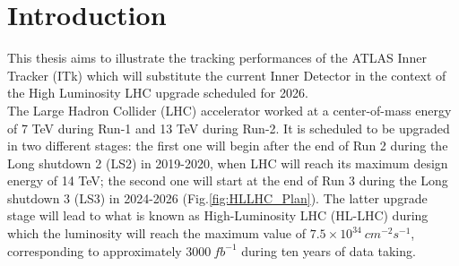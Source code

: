 \documentclass[a4paper,twoside,12pt]{article}
\begin{document}


\maketitle


\tableofcontents
\newpage

\newpage

\section*{Introduction} \label{sec:introduction}
This thesis aims to illustrate the tracking performances of the ATLAS Inner Tracker (ITk) which will substitute the current Inner Detector in the context
of the High Luminosity LHC upgrade scheduled for 2026. \\

The Large Hadron Collider (LHC) accelerator worked at a center-of-mass energy of 7 TeV during Run-1 and 13 TeV during Run-2. It is scheduled to be upgraded in two different stages: the first one will begin after the end of Run 2 during the Long shutdown 2 (LS2) in 2019-2020, when LHC will reach its maximum design energy of 14 TeV; the second one will start at the end of Run 3 during the Long shutdown 3 (LS3) in 2024-2026 (Fig.\ref{fig:HLLHC_Plan}). The latter upgrade stage will lead to what is known as High-Luminosity LHC (HL-LHC) during which the
luminosity will reach the maximum value of $7.5 \times 10^{34}\ cm^{-2}s^{-1}$, corresponding to approximately $3000\ fb^{-1}$ during ten years of data taking. \\
\end{document}
